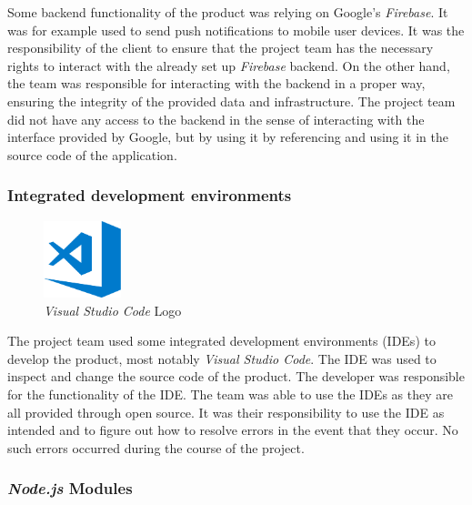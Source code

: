 Some backend functionality of the product was relying on Google's \textit{Firebase}. It was for example used to send push notifications to mobile user devices.
\newline
It was the responsibility of the client to ensure that the project team has the necessary rights to interact with the already set up \textit{Firebase} backend. On the other hand, the team was responsible for interacting with the backend in a proper way, ensuring the integrity of the provided data and infrastructure. The project team did not have any access to the backend in the sense of interacting with the interface provided by Google, but by using it by referencing and using it in the source code of the application.

\subsubsection{Integrated development environments}
\label{sssec:ides}

\begin{figure}[H]
    \begin{center}
        \includegraphics[width=0.2\textwidth]{images/logos/visual-studio-code-logo.png}
        \caption{\textit{Visual Studio Code} Logo}
        \label{fig:visual-studio-code_logo}
    \end{center}
\end{figure}

The project team used some integrated development environments (IDEs) to develop the product, most notably \textit{Visual Studio Code}. The IDE was used to inspect and change the source code of the product.
\newline
The developer was responsible for the functionality of the IDE. The team was able to use the IDEs as they are all provided through open source. It was their responsibility to use the IDE as intended and to figure out how to resolve errors in the event that they occur. No such errors occurred during the course of the project.

\subsubsection{\textit{Node.js} Modules}
\label{sssec:nodejs_modules}

